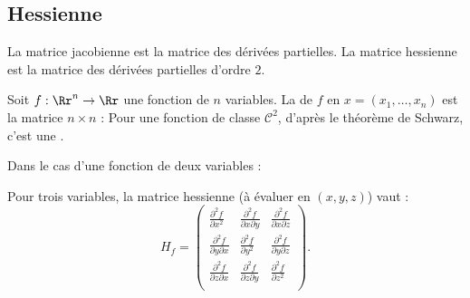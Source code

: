 \subsection{Hessienne}

La matrice jacobienne est la matrice des dérivées partielles.
La matrice hessienne est la matrice des dérivées partielles d'ordre $2$.

Soit $f : \Rr^n \to \Rr$ une fonction de $n$ variables.
La  de $f$ en $x=(x_1,\ldots,x_n)$ est la matrice $n \times n$ :
Pour une fonction de classe $\mathcal{C}^2$, d'après le théorème de Schwarz, c'est une .


Dans le cas d'une fonction de deux variables :

\bigskip

Pour trois variables, la matrice hessienne (à évaluer en $(x,y,z)$) vaut :
$$H_f=
\begin{pmatrix}
\frac{\partial^2f}{\partial x^2}&\frac{\partial^2f}{\partial x\partial y}&\frac{\partial^2f}{\partial x\partial z}\\  \frac{\partial^2f}{\partial y\partial x}&\frac{\partial^2f}{\partial y^2}&\frac{\partial^2f}{\partial y\partial z}\\  \frac{\partial^2f}{\partial z\partial x}&\frac{\partial^2f}{\partial z\partial y}&\frac{\partial^2f}{\partial z^2}\\
\end{pmatrix}.$$

